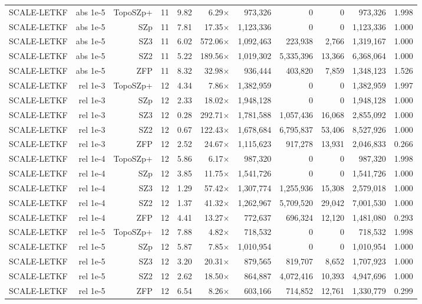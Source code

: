 \begin{tabular}{lrrrrrrrrrr}
SCALE-LETKF & abs 1e-5 & TopoSZp+ & 11 & 9.82 & 6.29$\times$ & 973,326 & 0 & 0 & 973,326 & 1.998 \\
SCALE-LETKF & abs 1e-5 & SZp & 11 & 7.81 & 17.35$\times$ & 1,123,336 & 0 & 0 & 1,123,336 & 1.000 \\
SCALE-LETKF & abs 1e-5 & SZ3 & 11 & 6.02 & 572.06$\times$ & 1,092,463 & 223,938 & 2,766 & 1,319,167 & 1.000 \\
SCALE-LETKF & abs 1e-5 & SZ2 & 11 & 5.22 & 189.56$\times$ & 1,019,302 & 5,335,396 & 13,366 & 6,368,064 & 1.000 \\
SCALE-LETKF & abs 1e-5 & ZFP & 11 & 8.32 & 32.98$\times$ & 936,444 & 403,820 & 7,859 & 1,348,123 & 1.526 \\
SCALE-LETKF & rel 1e-3 & TopoSZp+ & 12 & 4.34 & 7.86$\times$ & 1,382,959 & 0 & 0 & 1,382,959 & 1.997 \\
SCALE-LETKF & rel 1e-3 & SZp & 12 & 2.33 & 18.02$\times$ & 1,948,128 & 0 & 0 & 1,948,128 & 1.000 \\
SCALE-LETKF & rel 1e-3 & SZ3 & 12 & 0.28 & 292.71$\times$ & 1,781,588 & 1,057,436 & 16,068 & 2,855,092 & 1.000 \\
SCALE-LETKF & rel 1e-3 & SZ2 & 12 & 0.67 & 122.43$\times$ & 1,678,684 & 6,795,837 & 53,406 & 8,527,926 & 1.000 \\
SCALE-LETKF & rel 1e-3 & ZFP & 12 & 2.52 & 24.67$\times$ & 1,115,623 & 917,278 & 13,931 & 2,046,833 & 0.266 \\
SCALE-LETKF & rel 1e-4 & TopoSZp+ & 12 & 5.86 & 6.17$\times$ & 987,320 & 0 & 0 & 987,320 & 1.998 \\
SCALE-LETKF & rel 1e-4 & SZp & 12 & 3.85 & 11.75$\times$ & 1,541,726 & 0 & 0 & 1,541,726 & 1.000 \\
SCALE-LETKF & rel 1e-4 & SZ3 & 12 & 1.29 & 57.42$\times$ & 1,307,774 & 1,255,936 & 15,308 & 2,579,018 & 1.000 \\
SCALE-LETKF & rel 1e-4 & SZ2 & 12 & 1.37 & 41.32$\times$ & 1,262,967 & 5,709,520 & 29,042 & 7,001,530 & 1.000 \\
SCALE-LETKF & rel 1e-4 & ZFP & 12 & 4.41 & 13.27$\times$ & 772,637 & 696,324 & 12,120 & 1,481,080 & 0.293 \\
SCALE-LETKF & rel 1e-5 & TopoSZp+ & 12 & 7.88 & 4.82$\times$ & 718,532 & 0 & 0 & 718,532 & 1.998 \\
SCALE-LETKF & rel 1e-5 & SZp & 12 & 5.87 & 7.85$\times$ & 1,010,954 & 0 & 0 & 1,010,954 & 1.000 \\
SCALE-LETKF & rel 1e-5 & SZ3 & 12 & 3.20 & 20.31$\times$ & 879,565 & 819,707 & 8,652 & 1,707,923 & 1.000 \\
SCALE-LETKF & rel 1e-5 & SZ2 & 12 & 2.62 & 18.50$\times$ & 864,887 & 4,072,416 & 10,393 & 4,947,696 & 1.000 \\
SCALE-LETKF & rel 1e-5 & ZFP & 12 & 6.54 & 8.26$\times$ & 603,166 & 714,852 & 12,761 & 1,330,779 & 0.299 \\
\bottomrule
\end{tabular}

